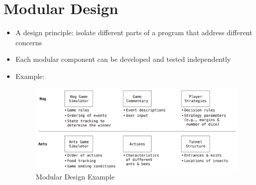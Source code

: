\section{Modular Design}
\begin{itemize}
    \item A design principle: isolate different parts of a program that address different concerns
    \item Each modular component can be developed and tested independently
    \item Example:
    \medskip
	\begin{figure}[H]
	\includegraphics[width=1\linewidth]{figures/modular_design_example.png}
	\caption{Modular Design Example}
	\end{figure}
\end{itemize}